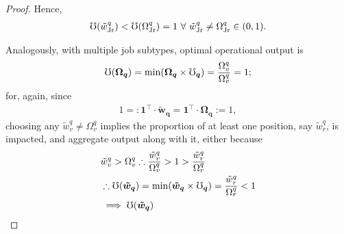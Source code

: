 \documentclass[hidelinks, nonatbib]{elsarticle}
\begin{document}
\begin{lemma}
\begin{proof}
        Hence, 
        \begin{gather}
            \mho(\tilde{w}_{\text{Jr}}^{q}) < 
            \mho(\Omega_{\text{Jr}}^{q}) 
            = 1
            \
            \forall
            \
            \tilde{w}_{\text{Jr}}^{q}
            \neq
            \Omega_{\text{Jr}}^{q}
            \in 
            (0,1)
            .
        \end{gather}
        
        Analogously, with multiple job subtypes, optimal operational output is
        \begin{gather}
            \mho(\boldsymbol{\Omega_q})
            = 
            \min(
                \boldsymbol{\Omega_q}
                \times
                \boldsymbol{\mho_q}
            )
            =
            \frac{
                \Omega_{v}^{q}
            }{
                \Omega_{v}^{q}
            }
            =
            1
            ;
        \end{gather}
        for, again, since
        \begin{gather}
            1
            =:
            \boldsymbol{1} ^ {\top}
            \cdot
            \boldsymbol{\tilde{w}_{q}}
            =
            \boldsymbol{1} ^ {\top}
            \cdot
            \boldsymbol{\Omega_{q}}
            := 1
            ,
        \end{gather}
        choosing any $\tilde{w}_{v}^{q} \neq \Omega_{v}^{q}$ implies the proportion of at least one position, say $\tilde{w}_{r}^{q}$, is impacted, and aggregate output along with it, either because
        \begin{align}
            &
            \tilde{w}_{v}^{q} > \Omega_{v}^{q}
            \therefore
            \frac{
                \tilde{w}_{v}^{q}
            }{
                \Omega_{v}^{q}
            }
            > 
            1
            > 
            \frac{
                \tilde{w}_{r}^{q}
            }{
                \Omega_{r}^{q}
            }
            \\
            &\therefore
            \oo(\boldsymbol{\tilde{w}_q})
            = 
            \min(
                \boldsymbol{\tilde{w}_q}
                \times
                \boldsymbol{\oo_q}
            )
            =
            \frac{
                \tilde{w}_{r}^{q}
            }{
                \Omega_{r}^{q}
            }
            < 
            1
            \\
            &
            \implies
            \oo(\boldsymbol{\tilde{w}_q})

\end{align}
\end{proof}
\end{lemma}
\end{document}
